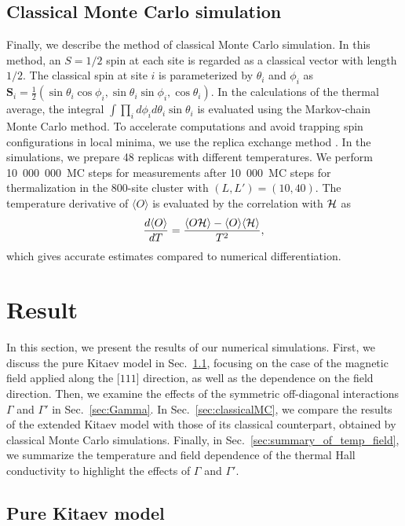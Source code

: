 \documentclass[twocolumn,superscriptaddress,showpacs, longbibliography, aps, prx]{revtex4-2}
\begin{document}
\subsection{Classical Monte Carlo simulation}\label{subsec:Classical Monte Carlo simulation}
Finally, we describe the method of classical Monte Carlo simulation.
In this method, an $S=1/2$ spin at each site is regarded as a classical vector with length $1/2$.
The classical spin at site $i$ is parameterized by $\theta_i$ and $\phi_i$ as $\bm{S}_i = \frac{1}{2}(\sin\theta_i\cos\phi_i, \sin\theta_i\sin\phi_i, \cos\theta_i)$.
In the calculations of the thermal average, the integral $\int \prod_i d\phi_i d\theta_i \sin\theta_i$ is evaluated using the Markov-chain Monte Carlo method.
To accelerate computations and avoid trapping spin configurations in local minima, we use the replica exchange method \cite{Hukushima1996}.
In the simulations, we prepare 48 replicas with different temperatures.
We perform 10~000~000~MC steps for measurements after 10~000~MC steps for thermalization in the 800-site cluster with $(L, L') = (10, 40)$. 
The temperature derivative of $\langle O \rangle$ is evaluated by the correlation with ${\cal H}$ as  
\begin{align}
\frac{d\langle O \rangle}
{dT}=\frac{
\langle O 
{\cal H}\rangle -\langle O 
\rangle \langle {\cal H}\rangle} 
{T^2},  
\end{align}
which gives accurate estimates compared to numerical differentiation. 


\section{Result}\label{sec:Results}
In this section, we present the results of our numerical simulations. First, we discuss the pure Kitaev model in Sec.~\ref{sec:pureKitaev}, focusing on the case of the magnetic field applied along the [$111$] direction, as well as the dependence on the field direction. 
Then, we examine the effects of the symmetric off-diagonal interactions $\Gamma$ and $\Gamma'$ in Sec.~\ref{sec:Gamma}. In Sec.~\ref{sec:classicalMC}, we compare the results of the extended Kitaev model with those of its classical counterpart, obtained by classical Monte Carlo simulations. 
Finally, in Sec.~\ref{sec:summary_of_temp_field}, we summarize the temperature and field dependence of the thermal Hall conductivity to highlight the effects of $\Gamma$ and $\Gamma'$.

\subsection{Pure Kitaev model}
\label{sec:pureKitaev}
\end{document}
